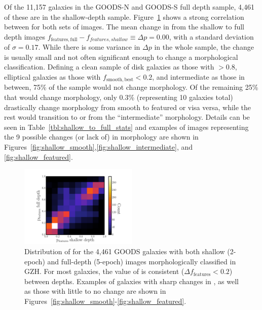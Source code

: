 \documentclass[twocolumn]{aastex6}
\begin{document}
Of the 11,157 galaxies in the GOODS-N and GOODS-S full depth sample, 4,461 of these are in the shallow-depth sample. Figure~\ref{fig:shallow_vs_full} shows a strong correlation between \ffeatures{} for both sets of images. The mean change in \ffeatures{} from the shallow to full depth images  $f_\mathrm{features,full} - f_{features,shallow} \equiv \Delta p = 0.00$, with a standard deviation of $\sigma = 0.17$. While there is some variance in $\Delta p$ in the whole sample, the change is usually small and not often significant enough to change a morphological classification. Defining a clean sample of disk galaxies as those with \fbest$>0.8$, elliptical galaxies as those with $f_\mathrm{smooth,best}<0.2$, and intermediate as those in between, 75\% of the sample would not change morphology. Of the remaining 25\% that would change morphology, only 0.3\% (representing 10 galaxies total) drastically change morphology from smooth to featured or visa versa, while the rest would transition to or from the ``intermediate'' morphology. Details can be seen in Table~\ref{tbl:shallow_to_full_stats} and examples of images representing the 9 possible changes (or lack of) in morphology are shown in Figures~\ref{fig:shallow_smooth},\ref{fig:shallow_intermediate}, and \ref{fig:shallow_featured}.

\begin{figure}
\begin{center}
\includegraphics[width=0.50\textwidth]{figures/full_shallow_p_plot.pdf}
\caption{Distribution of \ffeatures{} for the 4,461 GOODS galaxies with both shallow (2-epoch) and full-depth (5-epoch) images morphologically classified in GZH. For most galaxies, the value of \ffeatures{} is consistent ($\Delta f_\mathrm{features}<0.2$) between depths. Examples of galaxies with sharp changes in \ffeatures, as well as those with little to no change are shown in Figures~\ref{fig:shallow_smooth}-\ref{fig:shallow_featured}.}
\label{fig:shallow_vs_full}
\end{center}
\end{figure}
\end{document}
